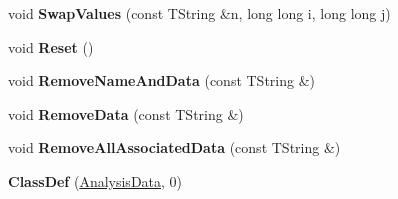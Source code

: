 \begin{DoxyCompactItemize}
\item 
\hypertarget{class_h_a_l_1_1_analysis_data_a44bfe71b3f3c88ce664e6d7b3bd9b111}{void {\bfseries Swap\+Values} (const T\+String \&n, long long i, long long j)}\label{class_h_a_l_1_1_analysis_data_a44bfe71b3f3c88ce664e6d7b3bd9b111}

\item 
\hypertarget{class_h_a_l_1_1_analysis_data_add418841a62be11aad64044e7eda5ffb}{void {\bfseries Reset} ()}\label{class_h_a_l_1_1_analysis_data_add418841a62be11aad64044e7eda5ffb}

\item 
\hypertarget{class_h_a_l_1_1_analysis_data_a39276ed7623a74cf6468fa9a69079e07}{void {\bfseries Remove\+Name\+And\+Data} (const T\+String \&)}\label{class_h_a_l_1_1_analysis_data_a39276ed7623a74cf6468fa9a69079e07}

\item 
\hypertarget{class_h_a_l_1_1_analysis_data_a35cbc682e6090bf2540ac62de07db82f}{void {\bfseries Remove\+Data} (const T\+String \&)}\label{class_h_a_l_1_1_analysis_data_a35cbc682e6090bf2540ac62de07db82f}

\item 
\hypertarget{class_h_a_l_1_1_analysis_data_a9e60f6b78b29280597ac991cf378f4f3}{void {\bfseries Remove\+All\+Associated\+Data} (const T\+String \&)}\label{class_h_a_l_1_1_analysis_data_a9e60f6b78b29280597ac991cf378f4f3}

\item 
\hypertarget{class_h_a_l_1_1_analysis_data_aeaaa3a24ced30e96d90725174a98544b}{{\bfseries Class\+Def} (\hyperlink{class_h_a_l_1_1_analysis_data}{Analysis\+Data}, 0)}\label{class_h_a_l_1_1_analysis_data_aeaaa3a24ced30e96d90725174a98544b}

\end{DoxyCompactItemize}
